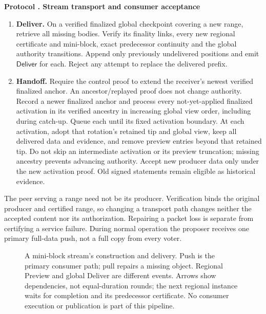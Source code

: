 \documentclass[11pt,a4paper,onecolumn]{article}
\newcommand{\RC}{\mathsf{RC}}
\newcommand{\Tag}[1]{\mathsf{#1}}
\newcommand{\Proc}[1]{\textnormal{\textsc{#1}}}
\theoremstyle{remark}\newtheorem{example}[definition]{Example}
\newcounter{protocol}
\newenvironment{protocol}[2]{\refstepcounter{protocol}\label{#1}\begin{mdframed}[nobreak=true,linewidth=.6pt,skipabove=10pt,skipbelow=10pt,innertopmargin=8pt,innerbottommargin=8pt]\small\raggedright\noindent\textbf{Protocol \theprotocol. #2}\par\smallskip}{\end{mdframed}}
\begin{document}
\begin{protocol}{alg:pull}{Stream transport and consumer acceptance}
\begin{enumerate}[label=\textbf{D\arabic*.}]
regional outcome chain with $\Proc{VerifyQC}$ on every $\RC$. Check that the
activation proof authorizes the receiver's current global view and its fixed
activation time has been reached. Append verified positions in order
to the preview suffix and emit $\Tag{Preview}$. Missing predecessors prevent
output. Stop extending an old global view after learning its finalized successor.
\item \textbf{Deliver.} On a verified finalized global checkpoint covering a
new range, retrieve all missing bodies. Verify its finality links, every new
regional certificate and mini-block, exact predecessor continuity and the global
authority transitions. Append only previously undelivered positions and emit
$\Tag{Deliver}$ for each. Reject any attempt to replace the delivered prefix.
\item \textbf{Handoff.} Require the control proof to extend the receiver's
newest verified finalized anchor. An ancestor/replayed proof does not change
authority. Record a newer finalized anchor and process every not-yet-applied
finalized activation in its verified ancestry in increasing global view order,
including during catch-up. Queue each until its fixed activation boundary.
At each activation, adopt that rotation's retained tip and global view, keep all
delivered data and evidence, and remove preview entries beyond that retained tip.
Do not skip an intermediate activation or its preview truncation; missing
ancestry prevents advancing authority. Accept new producer data only under
the new activation proof.
Old signed statements remain eligible as historical evidence.
\end{enumerate}
\end{protocol}

The peer serving a range need not be its producer. Verification binds the
original producer and certified range, so changing a transport path changes
neither the accepted content nor its authorization. Repairing a packet loss
is separate from certifying a service failure. During normal operation the
proposer receives one primary full-data push, not a full copy from every voter.

\begin{figure}[htbp]\centering

\caption{A mini-block stream's construction and delivery. Push is the primary
consumer path; pull repairs a missing object. Regional Preview and global
Deliver are different events. Arrows show dependencies, not equal-duration
rounds; the next regional instance waits for completion and its predecessor
certificate. No consumer execution or publication is
part of this pipeline.}
\label{fig:stream}
\end{figure}
\end{document}
